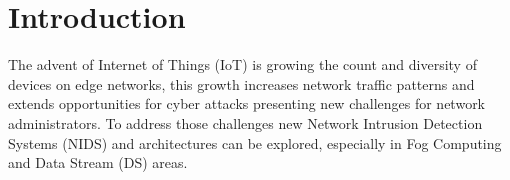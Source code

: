 \section{Introduction}


\newcommand{\refminas}{\textit{Ref}\xspace}
\newcommand{\mfog}{\textit{MFOG}\xspace}
\newcommand{\iot}{IoT\xspace}
\newcommand{\nids}{NIDS\xspace}
\newcommand{\ds}{DS\xspace}

The advent of Internet of Things (\iot) is growing the count and diversity of
devices on edge networks, this growth increases network traffic patterns and
extends opportunities for cyber attacks presenting new challenges for network
administrators.
To address those challenges new Network Intrusion Detection Systems (NIDS) and
architectures can be explored, especially in Fog Computing and Data Stream (DS)
areas.

